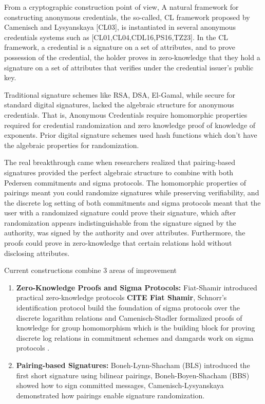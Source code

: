 {From a cryptographic construction point of view, A natural framework for constructing anonymous credentials, the so-called, CL framework proposed by Camenisch and Lysyanskaya [CL03], is instantiated in several anonymous credentials systems such as [CL01,CL04,CDL16,PS16,TZ23]. In the CL framework, a credential is a signature on a set of attributes, and to prove possession of the credential, the holder proves in zero-knowledge that they hold a signature on a set of attributes that verifies under the credential issuer’s public key.

Traditional signature schemes like RSA, DSA, El-Gamal, while secure for standard digital signatures, lacked the algebraic structure for anonymous credentials. That is, Anonymous Credentials require homomorphic properties required for credential randomization and zero knowledge proof of knowledge of exponents. Prior digital signature schemes used hash functions which don't have the algebraic properties for randomization. 

The real breakthrough came when researchers realized that pairing-based signatures provided the perfect algebraic structure to combine with both Pedersen commitments and sigma protocols. The homomorphic properties of pairings meant you could randomize signatures while preserving verifiability, and the discrete log setting of both commitments and sigma protocols meant that the user with a randomized signature could prove their signature, which after randomization appears indistinguishable from the signature signed by the authority, was signed by the authority and over attributes. Furthermore, the proofs could prove in zero-knowledge that certain relations hold without disclosing attributes. 

Current constructions combine 3 areas of improvement
\begin{enumerate}
    \item \textbf{Zero-Knowledge Proofs and Sigma Protocols:} Fiat-Shamir introduced practical zero-knowledge protocols \textbf{CITE Fiat Shamir}, Schnorr's identification protocol build the foundation of sigma protocols over the discrete logarithm relations \cite{brands1996privacy, goos_rapid_1997, brands_rethinking_2000} and Camenisch-Stadler formalized proofs of knowledge for group homomorphism which is the building block for proving discrete log relations in commitment schemes \cite{goos_efficient_1997} and damgards work on sigma protocols \cite{damgard_sigma_2010}.

    \item \textbf{Pairing-based Signatures: } Boneh-Lynn-Shacham (BLS) \cite{goos_short_2001} introduced the first short signature using bilinear pairings, Boneh-Boyen-Shacham (BBS) \cite{hutchison_short_2004} showed how to sign committed messages, Camenisch-Lysyanskaya \cite{cimato_signature_2003, hutchison_signature_2004} demonstrated how pairings enable signature randomization.


\end{enumerate}}
